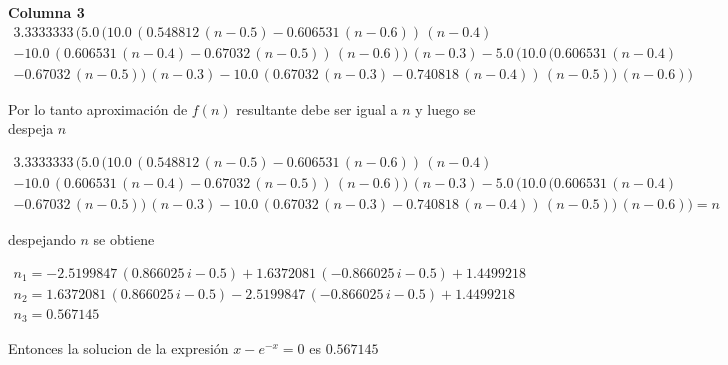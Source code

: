 \textbf{Columna 3}
\[
\begin{array}{l}
3.3333333\,(5.0\,(10.0\,(0.548812\,(n-0.5)-0.606531\,(n-0.6))\,(n-0.4)\\
-10.0\,(0.606531\,(n-0.4)-0.67032\,(n-0.5))\,(n-0.6))\,(n-0.3)-5.0\,(10.0\,(0.606531\,(n-0.4)\\
-0.67032\,(n-0.5))\,(n-0.3)-10.0\,(0.67032\,(n-0.3)-0.740818\,(n-0.4))\,(n-0.5))\,(n-0.6))
\end{array}
\]

Por lo tanto aproximación de $f(n)$ resultante debe ser igual a
$n$ y luego se despeja $n$

\[
\begin{array}{l}
3.3333333\,(5.0\,(10.0\,(0.548812\,(n-0.5)-0.606531\,(n-0.6))\,(n-0.4)\\
-10.0\,(0.606531\,(n-0.4)-0.67032\,(n-0.5))\,(n-0.6))\,(n-0.3)-5.0\,(10.0\,(0.606531\,(n-0.4)\\
-0.67032\,(n-0.5))\,(n-0.3)-10.0\,(0.67032\,(n-0.3)-0.740818\,(n-0.4))\,(n-0.5))\,(n-0.6))=n
\end{array}
\]

despejando $n$ se obtiene

\[
\begin{array}{l}
n_1=-2.5199847\,(0.866025\,i-0.5)+1.6372081\,(-0.866025\,i-0.5)+1.4499218\\
n_2=1.6372081\,(0.866025\,i-0.5)-2.5199847\,(-0.866025\,i-0.5)+1.4499218\\
n_3=0.567145
\end{array}
\]

Entonces la solucion de la expresión $x-e^{-x}=0$ es $0.567145$


